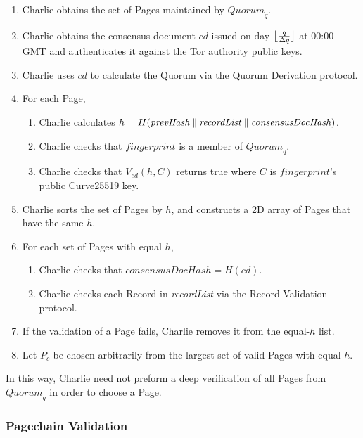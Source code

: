 \begin{enumerate}
	\item Charlie obtains the set of Pages maintained by $ \mathit{Quorum}_{q} $.
	\item Charlie obtains the consensus document $ \mathit{cd} $ issued on day $ \floor[\big]{\frac{q}{\Delta q}} $ at 00:00 GMT and authenticates it against the Tor authority public keys.
	\item Charlie uses $ \mathit{cd} $ to calculate the Quorum via the Quorum Derivation protocol.
	\item For each Page,
		\begin{enumerate}
			\item Charlie calculates $ h = H(\mathit{prevHash} \concat \mathit{recordList} \concat \mathit{consensusDocHash}) $.
			\item Charlie checks that $ \mathit{fingerprint} $ is a member of $ \mathit{Quorum}_{q} $.
			\item Charlie checks that $ V_{\mathit{ed}}(h, C) $ returns true where $ C $ is $ \mathit{fingerprint} $'s public Curve25519 key.
		\end{enumerate}
	\item Charlie sorts the set of Pages by $ h $, and constructs a 2D array of Pages that have the same $ h $.
	\item For each set of Pages with equal $ h $,
		\begin{enumerate}
			\item Charlie checks that $ \mathit{consensusDocHash} = H(\mathit{cd}) $.
			\item Charlie checks each Record in \emph{recordList} via the Record Validation protocol.
		\end{enumerate}
	\item If the validation of a Page fails, Charlie removes it from the equal-$ h $ list.
	\item Let $ P_{c} $ be chosen arbitrarily from the largest set of valid Pages with equal $ h $.
\end{enumerate}

In this way, Charlie need not preform a deep verification of all Pages from $ \mathit{Quorum}_{q} $ in order to choose a Page.

\subsubsection{Pagechain Validation}


